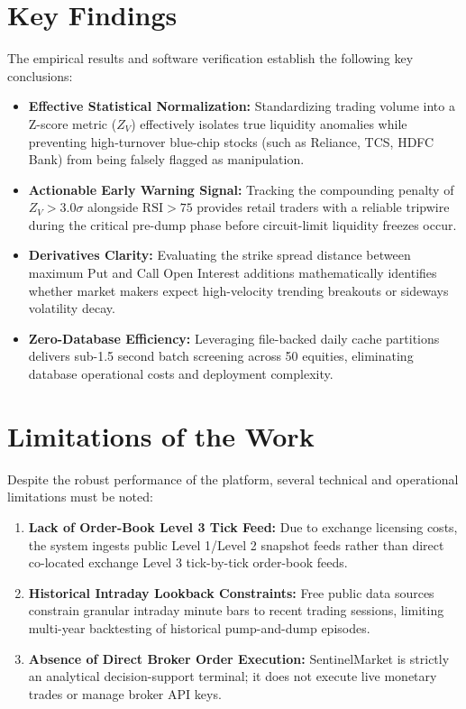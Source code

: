 \section{Key Findings}
The empirical results and software verification establish the following key conclusions:
\begin{itemize}
    \item \textbf{Effective Statistical Normalization:} Standardizing trading volume into a Z-score metric ($Z_V$) effectively isolates true liquidity anomalies while preventing high-turnover blue-chip stocks (such as Reliance, TCS, HDFC Bank) from being falsely flagged as manipulation.
    \item \textbf{Actionable Early Warning Signal:} Tracking the compounding penalty of $Z_V > 3.0\sigma$ alongside $\text{RSI} > 75$ provides retail traders with a reliable tripwire during the critical pre-dump phase before circuit-limit liquidity freezes occur.
    \item \textbf{Derivatives Clarity:} Evaluating the strike spread distance between maximum Put and Call Open Interest additions mathematically identifies whether market makers expect high-velocity trending breakouts or sideways volatility decay.
    \item \textbf{Zero-Database Efficiency:} Leveraging file-backed daily cache partitions delivers sub-1.5 second batch screening across 50 equities, eliminating database operational costs and deployment complexity.
\end{itemize}

\section{Limitations of the Work}
Despite the robust performance of the platform, several technical and operational limitations must be noted:
\begin{enumerate}
    \item \textbf{Lack of Order-Book Level 3 Tick Feed:} Due to exchange licensing costs, the system ingests public Level 1/Level 2 snapshot feeds rather than direct co-located exchange Level 3 tick-by-tick order-book feeds.
    \item \textbf{Historical Intraday Lookback Constraints:} Free public data sources constrain granular intraday minute bars to recent trading sessions, limiting multi-year backtesting of historical pump-and-dump episodes.
    \item \textbf{Absence of Direct Broker Order Execution:} SentinelMarket is strictly an analytical decision-support terminal; it does not execute live monetary trades or manage broker API keys.
\end{enumerate}

